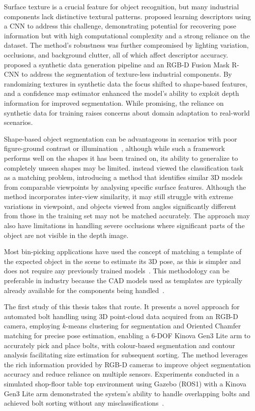 Surface texture is a crucial feature for object recognition, but many industrial components lack
distinctive textural patterns. \citet{wohlhart2015learning} proposed learning descriptors using a
CNN to address this challenge, demonstrating potential for recovering pose information but with high
computational complexity and a strong reliance on the dataset. The method's robustness was further
compromised by lighting variation, occlusions, and background clutter, all of which affect
descriptor accuracy. \citet{back2020segmenting} proposed a synthetic data generation pipeline and
an RGB-D Fusion Mask R-CNN to address the segmentation of texture-less industrial components. By
randomizing textures in synthetic data the focus shifted to shape-based features, and a confidence
map estimator enhanced the model's ability to exploit depth information for improved segmentation.
While promising, the reliance on synthetic data for training raises concerns about domain adaptation
to real-world scenarios.

Shape-based object segmentation can be advantageous in scenarios with poor figure-ground contrast
or illumination~\citep{borenstein2006shape}, although while such a framework performs well on the
shapes it has been trained on, its ability to generalize to completely unseen shapes may be limited.
\citet{wohlkinger2011shape} instead viewed the classification task as a matching problem,
introducing a method that identifies similar 3D models from comparable viewpoints by analysing
specific surface features. Although the method incorporates inter-view similarity, it may still
struggle with extreme variations in viewpoint, and objects viewed from angles significantly
different from those in the training set may not be matched accurately. The approach may also have
limitations in handling severe occlusions where significant parts of the object are not visible in
the depth image.

Most bin-picking applications have used the concept of matching a template of the expected object in
the scene to estimate its 3D pose, as this is simpler and does not require any previously trained
models~\citep{liu2012fast,guo2020fast,nguyen2022templates}. This methodology can be preferable in
industry because the CAD models used as templates are typically already available for the components
being handled~\citep{yan2020fastobjectpose}.

The first study of this thesis takes that route. It presents a novel approach for automated bolt
handling using 3D point-cloud data acquired from an RGB-D camera, employing $k$-means clustering
for segmentation and Oriented Chamfer matching for precise pose estimation, enabling a 6-DOF Kinova Gen3 Lite arm to accurately pick and place bolts, with colour-based segmentation and contour analysis facilitating size estimation for subsequent sorting. The method leverages the rich information provided by RGB-D cameras to improve object segmentation accuracy and reduce reliance on multiple sensors. Experiments conducted in a simulated shop-floor table top environment using Gazebo (ROS1) with a Kinova Gen3 Lite arm demonstrated the system's ability to handle overlapping bolts and achieved bolt sorting without any misclassifications~\citep{sk2024bolthandling}.


